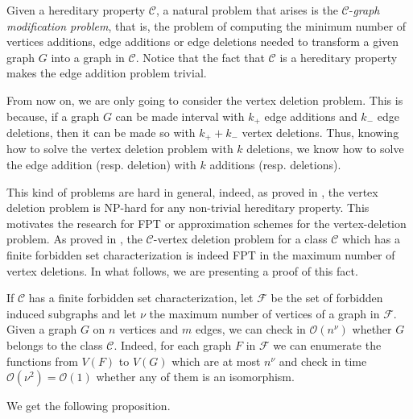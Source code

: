 \documentclass{article}
\begin{document}
    Given a hereditary property $\mathcal{C}$,
    a natural problem that arises
    is the $\mathcal{C}$-\emph{graph modification problem}, 
    that is, the problem of computing the minimum
    number of vertices additions, edge additions or 
    edge deletions needed to transform a given graph $G$ into
    a graph in $\mathcal{C}$. 
    Notice that the fact that $\mathcal{C}$ is 
    a hereditary property
    makes the edge addition problem trivial.
    
    From now on, we are only going 
    to consider the vertex deletion problem. 
    This is because, if a graph $G$ can be made
    interval with $k_{+}$ edge additions
    and $k_{-}$ edge deletions,
    then it can be made so with $k_{+} + k_{-}$ 
    vertex deletions.
    Thus, knowing how to solve
    the vertex deletion problem 
    with $k$ deletions, we know
    how to solve the edge addition
    (resp. deletion) with $k$ 
    additions (resp. deletions).

    This kind of problems are hard in general, indeed, as proved in 
    \cite{NP-hard}, the vertex deletion problem is NP-hard
    for any non-trivial hereditary property.
    This motivates the research for FPT or approximation 
    schemes for the vertex-deletion problem. 
    As proved in \cite{FPT-algos}, the
    $\mathcal{C}$-vertex deletion problem
    for a class $\mathcal{C}$ which has
    a finite forbidden set
    characterization is indeed
    FPT in the maximum number of vertex deletions.
    In what follows, we are presenting a proof of this fact.

    If $\mathcal{C}$ has 
    a finite forbidden set characterization,
    let $\mathcal{F}$ be the set of forbidden induced subgraphs and
    let $\nu$ the maximum number of vertices of a graph in $\mathcal{F}$.
    Given a graph $G$ on $n$ vertices and $m$ edges,
    we can check in $\mathcal{O} \left(n^{\nu}\right)$
    whether $G$ belongs to the class $\mathcal{C}$.
    Indeed, for each graph $F$ in $\mathcal{F}$ 
    we can enumerate the functions from $V\left(F\right)$
    to $V\left(G\right)$ which are at most $n^{\nu}$
    and check in time $\mathcal{O} \left(\nu^{2}\right) = \mathcal{O}\left(1\right)$ whether
    any of them is an isomorphism.

    We get the following proposition.
\end{document}
